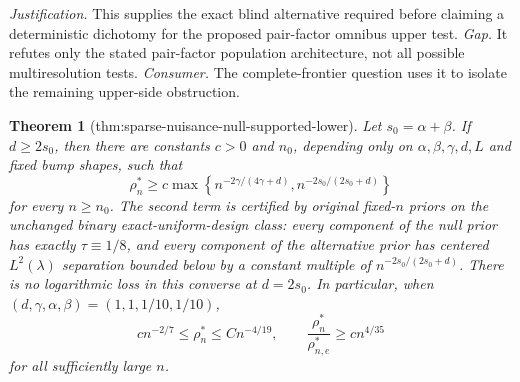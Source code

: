 \documentclass{article}
\newtheorem{theorem}{Theorem}
\begin{document}
\par\smallskip\noindent \textit{Justification.} This supplies the exact blind alternative required before claiming a deterministic dichotomy for the proposed pair-factor omnibus upper test. \textit{Gap.} It refutes only the stated pair-factor population architecture, not all possible multiresolution tests. \textit{Consumer.} The complete-frontier question uses it to isolate the remaining upper-side obstruction.

\begin{theorem}[thm:sparse-nuisance-null-supported-lower]\label{thm:sparse-nuisance-null-supported-lower}
Let \(s_0=\alpha+\beta\).  If \(d\geq 2s_0\), then there are constants \(c>0\) and \(n_0\), depending only on \(\alpha,\beta,\gamma,d,L\) and fixed bump shapes, such that
\[
 \rho_n^*\geq c\max\left\{
 n^{-2\gamma/(4\gamma+d)},
 n^{-2s_0/(2s_0+d)}
 \right\}
\]
for every \(n\geq n_0\).  The second term is certified by original fixed-\(n\) priors on the unchanged binary exact-uniform-design class: every component of the null prior has exactly \(\tau\equiv1/8\), and every component of the alternative prior has centered \(L^2(\lambda)\) separation bounded below by a constant multiple of \(n^{-2s_0/(2s_0+d)}\).  There is no logarithmic loss in this converse at \(d=2s_0\).  In particular, when \((d,\gamma,\alpha,\beta)=(1,1,1/10,1/10)\),
\[
 c n^{-2/7}\leq\rho_n^*\leq Cn^{-4/19},
 \qquad
 \frac{\rho_n^*}{\rho_{n,e}^*}\geq c n^{4/35}
\]
for all sufficiently large \(n\).
\end{theorem}
\end{document}
